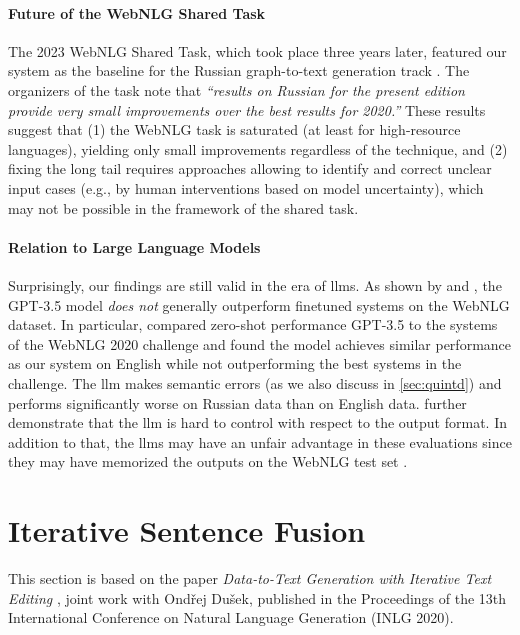 \paragraph{Future of the WebNLG Shared Task} The 2023 WebNLG Shared Task, which took place three years later, featured our system as the baseline for the Russian graph-to-text generation track \cite{cripwell2023WebNLGShared2023}. The organizers of the task note that \textit{``results on Russian for the present edition provide very small improvements over the best results for 2020.''} These results suggest that (1) the WebNLG task is saturated (at least for high-resource languages), yielding only small improvements regardless of the technique, and (2) fixing the long tail requires approaches allowing to identify and correct unclear input cases (e.g., by human interventions based on model uncertainty), which may not be possible in the framework of the shared task.


\paragraph{Relation to Large Language Models} Surprisingly, our findings are still valid in the era of \acp{llm}. As shown by  \citet{axelssonUsingLargeLanguage2023} and \citet{yuanEvaluatingGenerativeModels2023}, the GPT-3.5 model \cite{chatgpt} \emph{does not} generally outperform finetuned systems on the WebNLG dataset. In particular, \citet{axelssonUsingLargeLanguage2023} compared zero-shot performance GPT-3.5 to the systems of the WebNLG 2020 challenge and found the model achieves similar performance as our system on English while not outperforming the best systems in the challenge. The \ac{llm} makes semantic errors (as we also discuss in \autoref{sec:quintd}) and performs significantly worse on Russian data than on English data. \citet{yuanEvaluatingGenerativeModels2023} further demonstrate that the \ac{llm} is hard to control with respect to the output format. In addition to that, the \acp{llm} may have an unfair advantage in these evaluations since they may have memorized the outputs on the WebNLG test set \cite{balloccu2024leak}.



\section{Iterative Sentence Fusion}
\label{sec:iterative}

\begin{refbox}
    This section is based on the paper \emph{Data-to-Text Generation with Iterative Text Editing} \cite{kasnerDatatoTextGenerationIterative2020}, joint work with Ondřej Dušek, published in the Proceedings of the 13th International Conference on Natural Language Generation (INLG 2020).
\end{refbox}

